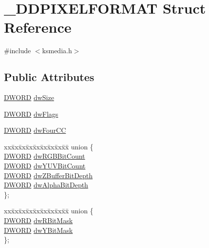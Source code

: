 \hypertarget{struct___d_d_p_i_x_e_l_f_o_r_m_a_t}{}\section{\+\_\+\+D\+D\+P\+I\+X\+E\+L\+F\+O\+R\+M\+AT Struct Reference}
\label{struct___d_d_p_i_x_e_l_f_o_r_m_a_t}


{\ttfamily \#include $<$ksmedia.\+h$>$}

\subsection*{Public Attributes}
\begin{DoxyCompactItemize}
\item 
\hyperlink{mapinls_8h_ad342ac907eb044443153a22f964bf0af}{D\+W\+O\+RD} \hyperlink{struct___d_d_p_i_x_e_l_f_o_r_m_a_t_a4765b40be2b51f564dd772df38a28d13}{dw\+Size}
\item 
\hyperlink{mapinls_8h_ad342ac907eb044443153a22f964bf0af}{D\+W\+O\+RD} \hyperlink{struct___d_d_p_i_x_e_l_f_o_r_m_a_t_ad26631effea4a5e7591bfd74166f9378}{dw\+Flags}
\item 
\hyperlink{mapinls_8h_ad342ac907eb044443153a22f964bf0af}{D\+W\+O\+RD} \hyperlink{struct___d_d_p_i_x_e_l_f_o_r_m_a_t_a694e917d63f07e4c4ff3e6c0be888af1}{dw\+Four\+CC}
\item 
\begin{tabbing}
xx\=xx\=xx\=xx\=xx\=xx\=xx\=xx\=xx\=\kill
union \{\\
\>\hyperlink{mapinls_8h_ad342ac907eb044443153a22f964bf0af}{DWORD} \hyperlink{struct___d_d_p_i_x_e_l_f_o_r_m_a_t_aba8e4113c7ca8979b8de8fa7a26ede64}{dwRGBBitCount}\\
\>\hyperlink{mapinls_8h_ad342ac907eb044443153a22f964bf0af}{DWORD} \hyperlink{struct___d_d_p_i_x_e_l_f_o_r_m_a_t_ababaa080c037ab868635b3fa313453cd}{dwYUVBitCount}\\
\>\hyperlink{mapinls_8h_ad342ac907eb044443153a22f964bf0af}{DWORD} \hyperlink{struct___d_d_p_i_x_e_l_f_o_r_m_a_t_a45a93e2fa98814e64dea5e451ddcf1ca}{dwZBufferBitDepth}\\
\>\hyperlink{mapinls_8h_ad342ac907eb044443153a22f964bf0af}{DWORD} \hyperlink{struct___d_d_p_i_x_e_l_f_o_r_m_a_t_a611f8b7134eb953e9ddb432510a4d3fa}{dwAlphaBitDepth}\\
\}; \\

\end{tabbing}\item 
\begin{tabbing}
xx\=xx\=xx\=xx\=xx\=xx\=xx\=xx\=xx\=\kill
union \{\\
\>\hyperlink{mapinls_8h_ad342ac907eb044443153a22f964bf0af}{DWORD} \hyperlink{struct___d_d_p_i_x_e_l_f_o_r_m_a_t_abad565c62f0bd03bbc9e304113133ab8}{dwRBitMask}\\
\>\hyperlink{mapinls_8h_ad342ac907eb044443153a22f964bf0af}{DWORD} \hyperlink{struct___d_d_p_i_x_e_l_f_o_r_m_a_t_a56840faa9d025ba2d771f22ab158523d}{dwYBitMask}\\
\}; \\


\end{tabbing}
\end{DoxyCompactItemize}
